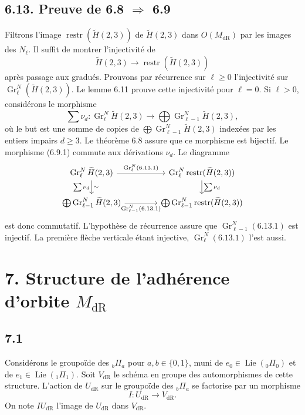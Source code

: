 \documentclass[10pt]{article}
\newcommand{\Lie}{\operatorname{Lie}}
\newcommand{\dR}{\mathrm{dR}}
\begin{document}
\subsection*{6.13. Preuve de 6.8 $\Rightarrow$ 6.9}
Filtrons l'image $\operatorname{restr}(\widetilde H(2,3))$ de $\widetilde H(2,3)$ dans $O(M_{\dR})$ par les images des $N_{\ell}$. Il suffit de montrer l'injectivité de
\begin{equation}
\widetilde H(2,3)\longrightarrow \operatorname{restr}(\widetilde H(2,3))
\tag{6.13.1}
\end{equation}
après passage aux gradués. Prouvons par récurrence sur $\ell\geq0$ l'injectivité sur $\operatorname{Gr}^{N}_{\ell}(\widetilde H(2,3))$. Le lemme 6.11 prouve cette injectivité pour $\ell=0$. Si $\ell>0$, considérons le morphisme
\[
\sum\nu_d:\operatorname{Gr}^{N}_{\ell}\widetilde H(2,3)\longrightarrow \bigoplus \operatorname{Gr}^{N}_{\ell-1}\widetilde H(2,3),
\]
où le but est une somme de copies de $\bigoplus \operatorname{Gr}^{N}_{\ell-1}\widetilde H(2,3)$ indexées par les entiers impairs $d\geq3$. Le théorème 6.8 assure que ce morphisme est bijectif. Le morphisme (6.9.1) commute aux dérivations $\nu_d$. Le diagramme
\[
\begin{tikzcd}[column sep=4.0em,row sep=1.7em]
\operatorname{Gr}^{N}_{\ell}\widetilde H(2,3) \arrow[r,"\operatorname{Gr}^{N}_{\ell}(6.13.1)"] \arrow[d,"\sum\nu_d"',"\sim"] &
\operatorname{Gr}^{N}_{\ell}\operatorname{restr}(\widetilde H(2,3)) \arrow[d,"\sum\nu_d"]\\
\bigoplus\operatorname{Gr}^{N}_{\ell-1}\widetilde H(2,3) \arrow[r,"\operatorname{Gr}^{N}_{\ell-1}(6.13.1)"'] &
\bigoplus\operatorname{Gr}^{N}_{\ell-1}\operatorname{restr}(\widetilde H(2,3))
\end{tikzcd}
\]
est donc commutatif. L'hypothèse de récurrence assure que $\operatorname{Gr}^{N}_{\ell-1}(6.13.1)$ est injectif. La première flèche verticale étant injective, $\operatorname{Gr}^{N}_{\ell}(6.13.1)$ l'est aussi.

\section*{7. Structure de l'adhérence d'orbite $M_{\dR}$}

\subsection*{7.1}
Considérons le groupoïde des ${}_b\Pi_a$ pour $a,b\in\{0,1\}$, muni de $e_0\in\Lie({}_0\Pi_0)$ et de $e_1\in\Lie({}_1\Pi_1)$. Soit $V_{\dR}$ le schéma en groupe des automorphismes de cette structure. L'action de $U_{\dR}$ sur le groupoïde des ${}_b\Pi_a$ se factorise par un morphisme
\begin{equation}
I:U_{\dR}\longrightarrow V_{\dR}.
\tag{7.1.1}
\end{equation}
On note $IU_{\dR}$ l'image de $U_{\dR}$ dans $V_{\dR}$.
\end{document}
